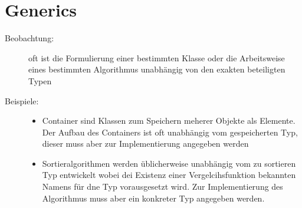 \section{Generics}
\begin{description}
	\item[Beobachtung:] oft ist die Formulierung einer bestimmten Klasse oder die Arbeitsweise eines bestimmten Algorithmus unabhängig von den exakten beteiligten Typen
	\item[Beispiele:]
	\begin{itemize}
		\item Container sind Klassen zum Speichern meherer Objekte als Elemente. Der Aufbau des Containers ist oft unabhängig vom gespeicherten Typ, dieser muss aber zur Implementierung angegeben werden
		\item Sortieralgorithmen werden üblicherweise unabhängig vom zu sortieren Typ entwickelt wobei dei Existenz einer Vergelcihsfunktion bekannten Namens für dne Typ vorausgesetzt wird. Zur Implementierung des Algorithmus muss aber ein konkreter Typ angegeben werden.
	\end{itemize}
\end{description}